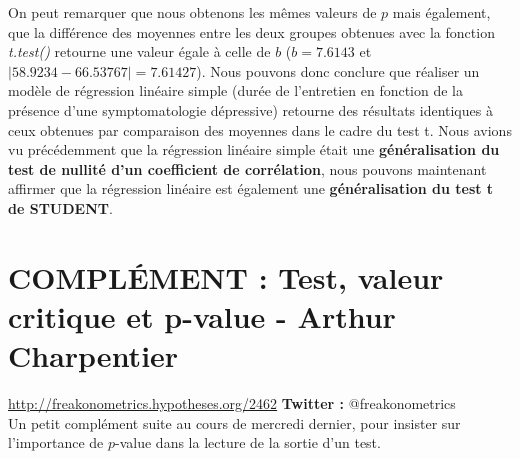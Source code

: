 On peut remarquer que nous obtenons les mêmes valeurs de $p$ mais également, que la différence des moyennes entre les deux groupes obtenues avec la fonction \textit{t.test()} retourne une valeur égale à celle de $b$ ($b = 7.6143$ et $|58.9234-66.53767| = 7.61427$).\newline
Nous pouvons donc conclure que réaliser un modèle de régression linéaire simple (durée de l'entretien en fonction de la présence d'une symptomatologie dépressive) retourne des résultats identiques à ceux obtenues par comparaison des moyennes dans le cadre du test t.\newline
Nous avions vu précédemment que la régression linéaire simple était une \textbf{généralisation du test de nullité d'un coefficient de corrélation}, nous pouvons maintenant affirmer que la régression linéaire est également une \textbf{généralisation du test t de STUDENT}.
\newpage



\newpage
\newpage
\section{COMPLÉMENT : Test, valeur critique et p-value - Arthur Charpentier}
\url{http://freakonometrics.hypotheses.org/2462}\newline
\textbf{Twitter : } @freakonometrics\newline
\\
Un petit complément suite au cours de mercredi dernier, pour insister sur l'importance de $p$-value dans la lecture de la sortie d'un test.\newline
\\
